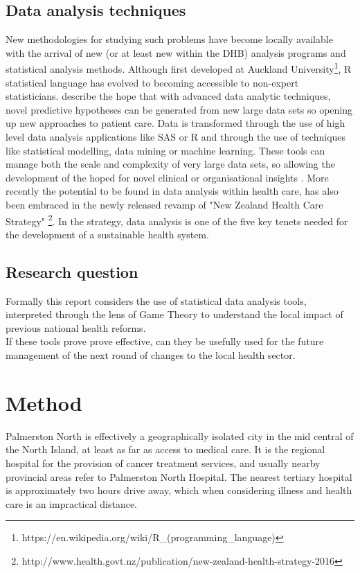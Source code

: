 \documentclass[11pt,a4paper]{article}
\begin{document}
\subsection{Data analysis techniques}
New methodologies for studying such problems have become locally available with the arrival of new (or at least new within the DHB) analysis programs and statistical analysis methods. Although first developed at Auckland University\footnote{https://en.wikipedia.org/wiki/R\_(programming\_language)}, R statistical language has evolved to becoming accessible to non-expert statisticians. \citet{khoury2014big}  describe the hope that with advanced data analytic techniques,  novel predictive hypotheses can be generated from new large data sets so opening up new approaches to patient care. Data is transformed through the use of high level data analysis applications like SAS or R and through the use of techniques like statistical modelling, data mining or machine learning. These tools can manage both the scale and complexity of very large data sets, so allowing the development of the hoped for novel clinical or organisational insights \citep{reshef2011detecting}.  More recently the potential to be found in data analysis within health care, has also been embraced in the newly released revamp of "New Zealand Health Care Strategy" \footnote{http://www.health.govt.nz/publication/new-zealand-health-strategy-2016}. In the strategy, data analysis is one of the five key tenets needed for the development of a sustainable health system. \\

\subsection{Research question}
Formally this report considers the use of statistical data analysis tools, interpreted through the lens of Game Theory to understand the local impact of previous national health reforms. \\

If these tools prove prove effective, can they be usefully used for the future management of the next round of changes to the local health sector.\\

\pagebreak
\section{Method}
Palmerston North is effectively a geographically isolated city in the mid central of the North Island, at least as far as access to medical care. It is the regional hospital for the provision of cancer treatment services, and usually nearby provincial areas refer to Palmerston North Hospital. The nearest tertiary hospital is approximately two hours drive away, which when considering illness and health care is an impractical distance.\\
\end{document}
